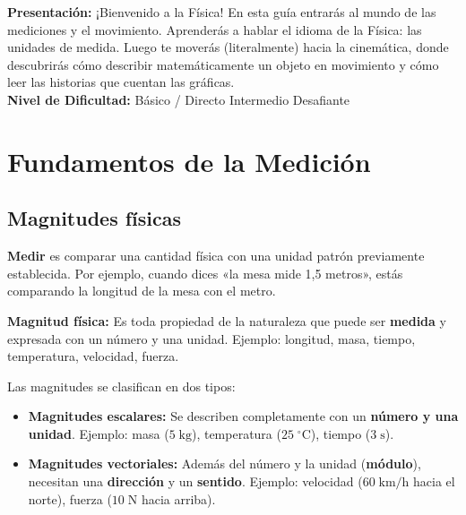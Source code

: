 \documentclass[12pt, letterpaper]{article}
\begin{document}


\vspace{4pt}
\begin{cuadroinfo}
  \small
  \textbf{Presentación:} ¡Bienvenido a la Física! En esta guía entrarás al mundo de las mediciones y el movimiento. Aprenderás a hablar el idioma de la Física: las unidades de medida. Luego te moverás (literalmente) hacia la cinemática, donde descubrirás cómo describir matemáticamente un objeto en movimiento y cómo leer las historias que cuentan las gráficas.
  \\[4pt]
  \textbf{Nivel de Dificultad:}\quad
  \facil{} Básico / Directo \quad
  \medio{} Intermedio \quad
  \dificil{} Desafiante
\end{cuadroinfo}

\vspace{8pt}

\section{Fundamentos de la Medición}

\subsection{Magnitudes físicas}

\textbf{Medir} es comparar una cantidad física con una unidad patrón previamente establecida. Por ejemplo, cuando dices «la mesa mide 1,5 metros», estás comparando la longitud de la mesa con el metro.

\begin{cuadroteoria}
  \textbf{Magnitud física:} Es toda propiedad de la naturaleza que puede ser \textbf{medida} y expresada con un número y una unidad. Ejemplo: longitud, masa, tiempo, temperatura, velocidad, fuerza.
\end{cuadroteoria}

Las magnitudes se clasifican en dos tipos:

\begin{cuadrosolucion}
  \begin{itemize}[leftmargin=*]
    \item \textbf{Magnitudes escalares:} Se describen completamente con un \textbf{número y una unidad}. Ejemplo: masa ($5\;\text{kg}$), temperatura ($25\;^\circ\text{C}$), tiempo ($3\;\text{s}$).

    \item \textbf{Magnitudes vectoriales:} Además del número y la unidad (\textbf{módulo}), necesitan una \textbf{dirección} y un \textbf{sentido}. Ejemplo: velocidad ($60\;\text{km/h}$ hacia el norte), fuerza ($10\;\text{N}$ hacia arriba).
  \end{itemize}
\end{cuadrosolucion}
\end{document}
